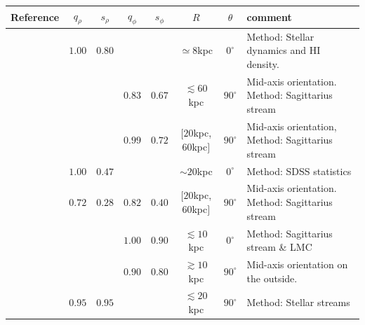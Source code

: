 \documentclass[a4paper,fleqn,usenatbib]{mnras}
\begin{document}
\begin{table}
\begin{tabular}{|c|cc|cc|c|c|p{4cm}|}\hline
Reference&$q_{\rho}$&$s_{\rho}$&$q_{\phi}$&$s_{\phi}$&$R$&$\theta$&comment\\ \hline \hline
\citet{Olling_and_Merrifield_2000}& $\mathbf{1.00}$ & $\mathbf{0.80}$ & & & $\simeq 8$kpc & $0^{\circ}$&Method: Stellar dynamics and HI density. \\\hline
\citet{Law_and_Majewski_2009}&&&$\mathbf{0.83}$&$\mathbf{0.67}$& $\lesssim 60$kpc&$90^{\circ}$&Mid-axis orientation. Method: Sagittarius stream\\\hline
%
\citet{Law_and_Majewski_2010}&&&$\mathbf{0.99}$&$\mathbf{0.72}$& $[20$kpc,$60$kpc$]$&$90^{\circ}$&Mid-axis orientation, Method: Sagittarius stream\\\hline
%
\citet{Loebman_et_al._2012}&$\mathbf{1.00}$&$\mathbf{0.47}$&&&$\sim 20$kpc &$0^{\circ}$&Method: SDSS statistics\\\hline
%
\citet{Deg_and_Widrow_2013}&$0.72$&$0.28$&$0.82$&$0.40$&$[20$kpc,$60$kpc$]$&$90^{\circ}$& Mid-axis orientation. Method: Sagittarius stream\\\hline
%
\multirow{2}{*}{\citet{Vera-Ciro_and_Helmi_2013}}&&&$\mathbf{1.00}$&$\mathbf{0.90}$&$\lesssim 10$kpc&$0^{\circ}$ & Method: Sagittarius stream \& LMC \\
&&&$\mathbf{0.90}$&$\mathbf{0.80}$&$\gtrsim 10$kpc&$90^{\circ}$& Mid-axis orientation on the outside. \\\hline
%
\citet{Bovy_et_el._2016}&$\mathbf{0.95}$&$\mathbf{0.95}$&&&$\lesssim 20$kpc&$90^{\circ}$ & Method: Stellar streams\\\hline

\end{tabular}
\end{table}



\end{document}
